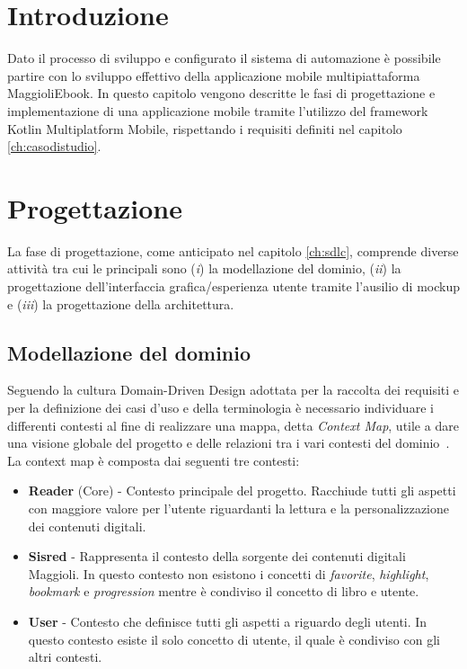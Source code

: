 
\section{Introduzione}
Dato il processo di sviluppo e configurato il sistema di automazione è possibile partire con lo sviluppo effettivo della applicazione mobile multipiattaforma MaggioliEbook. In questo capitolo vengono descritte le fasi di progettazione e implementazione di una applicazione mobile tramite l'utilizzo del framework Kotlin Multiplatform Mobile, rispettando i requisiti definiti nel capitolo \ref{ch:casodistudio}.

\section{Progettazione}
La fase di progettazione, come anticipato nel capitolo \ref{ch:sdlc}, comprende diverse attività tra cui le principali sono (\textit{i}) la modellazione del dominio, (\textit{ii}) la progettazione dell'interfaccia grafica/esperienza utente tramite l'ausilio di mockup e (\textit{iii}) la progettazione della architettura.

\subsection{Modellazione del dominio}
Seguendo la cultura Domain-Driven Design adottata per la raccolta dei requisiti e per la definizione dei casi d'uso e della terminologia è necessario individuare i differenti contesti al fine di realizzare una mappa, detta \textit{Context Map}, utile a dare una visione globale del progetto e delle relazioni tra i vari contesti del dominio~\cite{evans_domain-driven_2004}. La context map è composta dai seguenti tre contesti:

\begin{itemize}
    \item \textbf{Reader} (Core) - Contesto principale del progetto. Racchiude tutti gli aspetti con maggiore valore per l'utente riguardanti la lettura e la personalizzazione dei contenuti digitali. 
    \item \textbf{Sisred} - Rappresenta il contesto della sorgente dei contenuti digitali Maggioli. In questo contesto non esistono i concetti di \textit{favorite}, \textit{highlight}, \textit{bookmark} e \textit{progression} mentre è condiviso il concetto di libro e utente.
    \item \textbf{User} - Contesto che definisce tutti gli aspetti a riguardo degli utenti. In questo contesto esiste il solo concetto di utente, il quale è condiviso con gli altri contesti.
\end{itemize}

